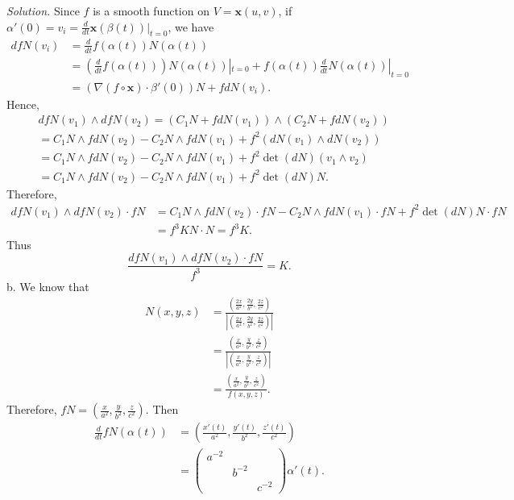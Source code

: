 \documentclass[12pt]{article}
\begin{document}
\textit{Solution.} Since $f$ is a smooth function on $V=\mathbf{x}(u,v)$, if $\alpha'(0) = v_i = \frac{d}{dt}\mathbf{x}(\beta(t))|_{t=0}$, we have \begin{align*}
     dfN(v_i) &= \frac{d}{dt}f(\alpha(t))N(\alpha(t))\\
     &=(\frac{d}{dt}f(\alpha(t)))N(\alpha(t))|_{t=0} + f(\alpha(t))\frac{d}{dt}N(\alpha(t))|_{t=0}\\
     &=(\nabla(f\circ \mathbf{x}) \cdot \beta'(0))N + fdN(v_i).
\end{align*}
Hence, \begin{align*}
    &dfN(v_1) \wedge dfN(v_2) = (C_1N + fdN(v_1)) \wedge (C_2N + fdN(v_2))\\
    &= C_1N\wedge fdN(v_2) - C_2N \wedge fdN(v_1)+f^2(dN(v_1) \wedge dN(v_2))\\
    &= C_1N\wedge fdN(v_2) - C_2N \wedge fdN(v_1)+f^2\det(dN)(v_1 \wedge v_2)\\
    &= C_1N\wedge fdN(v_2) - C_2N \wedge fdN(v_1)+f^2\det(dN)N.
\end{align*}
Therefore, \begin{align*}
    dfN(v_1) \wedge dfN(v_2) \cdot fN &= C_1N\wedge fdN(v_2) \cdot fN - C_2N \wedge fdN(v_1) \cdot fN +f^2\det(dN)N \cdot fN\\
    &=f^3KN\cdot N = f^3K.
\end{align*}
Thus \begin{equation*}
    \frac{dfN(v_1) \wedge dfN(v_2) \cdot fN }{f^3}=K.
\end{equation*}
b. We know that \begin{align*}
    N(x,y,z) &= \frac{(\frac{2x}{a^2},\frac{2y}{b^2},\frac{2z}{c^2})}{|(\frac{2x}{a^2},\frac{2y}{b^2},\frac{2z}{c^2})|}\\
    &= \frac{(\frac{x}{a^2},\frac{y}{b^2},\frac{z}{c^2})}{|(\frac{x}{a^2},\frac{y}{b^2},\frac{z}{c^2})|}\\
    &=\frac{(\frac{x}{a^2},\frac{y}{b^2},\frac{z}{c^2})}{f(x,y,z)}.
\end{align*}
Therefore, $fN = (\frac{x}{a^2},\frac{y}{b^2},\frac{z}{c^2})$. Then \begin{align*}
    \frac{d}{dt}fN(\alpha(t))&= (\frac{x'(t)}{a^2},\frac{y'(t)}{b^2},\frac{z'(t)}{c^2})\\
    &=\begin{pmatrix} a^{-2}&&\\&b^{-2}&\\&&c^{-2}\end{pmatrix} \alpha'(t).
\end{align*}
\end{document}
